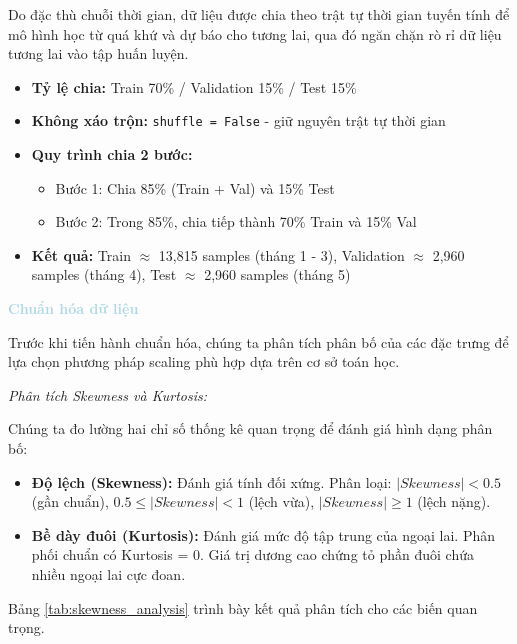 Do đặc thù chuỗi thời gian, dữ liệu được chia theo trật tự thời gian tuyến tính để mô hình học từ quá khứ và dự báo cho tương lai, qua đó ngăn chặn rò rỉ dữ liệu tương lai vào tập huấn luyện.

\begin{itemize}
    \item \textbf{Tỷ lệ chia:} Train 70\% / Validation 15\% / Test 15\%
    \item \textbf{Không xáo trộn:} \texttt{shuffle = False} - giữ nguyên trật tự thời gian
    \item \textbf{Quy trình chia 2 bước:}
    \begin{itemize}
        \item[$\circ$] Bước 1: Chia 85\% (Train + Val) và 15\% Test
        \item[$\circ$] Bước 2: Trong 85\%, chia tiếp thành 70\% Train và 15\% Val
    \end{itemize}
    \item \textbf{Kết quả:} Train $\approx$ 13,815 samples (tháng 1 - 3), Validation $\approx$ 2,960 samples (tháng 4), Test $\approx$ 2,960 samples (tháng 5)
\end{itemize}

\vspace{0.5em}
\noindent\textcolor{lightblue}{\textbf{Chuẩn hóa dữ liệu}}
\vspace{0.5em}

Trước khi tiến hành chuẩn hóa, chúng ta phân tích phân bố của các đặc trưng để lựa chọn phương pháp scaling phù hợp dựa trên cơ sở toán học.

\textit{Phân tích Skewness và Kurtosis:}

Chúng ta đo lường hai chỉ số thống kê quan trọng để đánh giá hình dạng phân bố:
\begin{itemize} [labelsep=10pt, leftmargin=2cm]
    \item \textbf{Độ lệch (Skewness):} Đánh giá tính đối xứng. Phân loại: $|Skewness| < 0.5$ (gần chuẩn), $0.5 \leq |Skewness| < 1$ (lệch vừa), $|Skewness| \geq 1$ (lệch nặng).
    \item \textbf{Bề dày đuôi (Kurtosis):} Đánh giá mức độ tập trung của ngoại lai. Phân phối chuẩn có Kurtosis = 0. Giá trị dương cao chứng tỏ phần đuôi chứa nhiều ngoại lai cực đoan.
\end{itemize}

Bảng \ref{tab:skewness_analysis} trình bày kết quả phân tích cho các biến quan trọng.

